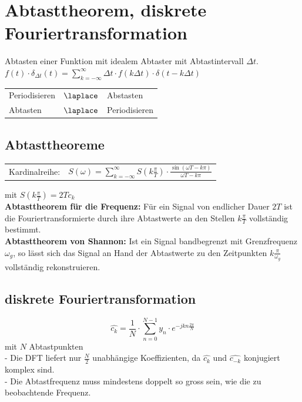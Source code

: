 
\section{Abtasttheorem, diskrete Fouriertransformation}
Abtasten einer Funktion mit idealem Abtaster mit Abtastintervall $\Delta t$.\\
$f(t) \cdot \delta_{\Delta t}(t) = \sum\limits_{k=-\infty}^{\infty} \Delta t \cdot f(k \Delta t) \cdot \delta(t-k \Delta t)$

\begin{tabular}{|l l l|}
	\hline
		Periodisieren &$\laplace$ & Abstasten\\
		Abtasten & $\laplace$ & Periodisieren\\
	\hline
\end{tabular}


\subsection{Abtasttheoreme}
	\begin{tabular}{ l l }
		Kardinalreihe: & $S(\omega) = \sum\limits_{k=-\infty}^{\infty} S(k\frac{\pi}{T}) \cdot \frac{\sin(\omega T - k\pi)}{\omega T - k\pi}$
	\end{tabular}
	mit $S(k\frac{\pi}{T}) = 2Tc_k$\\
	
	\textbf{Abtasttheorem f\"ur die Frequenz:}
	F\"ur ein Signal von endlicher Dauer $2T$ ist die Fouriertransformierte durch ihre Abtastwerte an den Stellen $k\frac{\pi}{T}$
	vollst\"andig bestimmt. \\
	
	\textbf{Abtasttheorem von Shannon:}
	Ist ein Signal bandbegrenzt mit Grenzfrequenz $\omega_g$, so l\"asst sich das Signal an Hand der Abtastwerte zu den Zeitpunkten
	$k\frac{\pi}{\omega_g}$ vollst\"andig rekonstruieren.
	
	
\subsection{diskrete Fouriertransformation}
	$$\hat{c_k} = \frac{1}{N} \cdot \sum\limits_{n=0}^{N-1} y_n \cdot e^{-jkn\frac{2\pi}{N}}$$
	mit $N$ Abtastpunkten\\
		-	Die DFT liefert nur $\frac{N}{2}$ unabh\"angige Koeffizienten, da $\hat{c_k}$ und $\hat{c_{-k}}$ konjugiert komplex sind.\\
		- Die Abtastfrequenz muss mindestens doppelt so gross sein, wie die zu beobachtende Frequenz.
	
